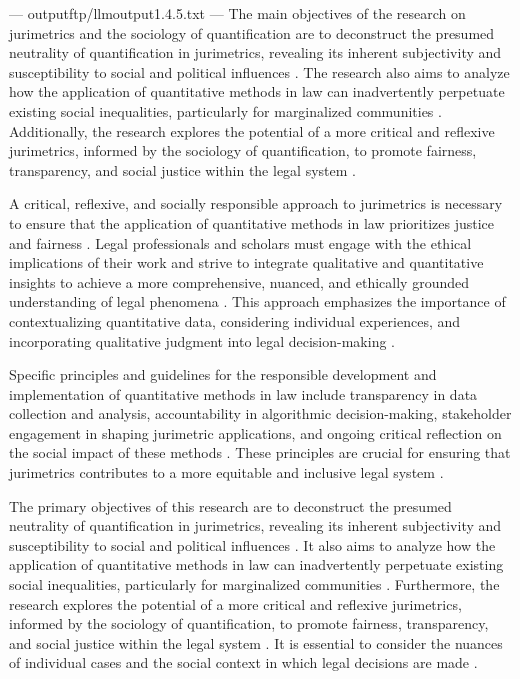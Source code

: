 ---
outputftp/llmoutput1.4.5.txt
---
The main objectives of the research on jurimetrics and the sociology of quantification are to deconstruct the presumed neutrality of quantification in jurimetrics, revealing its inherent subjectivity and susceptibility to social and political influences \cite{10.1590/dados.2022.65.3.267,10.1080/07329113.2015.1046739}. The research also aims to analyze how the application of quantitative methods in law can inadvertently perpetuate existing social inequalities, particularly for marginalized communities \cite{10.1590/dados.2022.65.3.267,10.1080/07329113.2015.1046739}. Additionally, the research explores the potential of a more critical and reflexive jurimetrics, informed by the sociology of quantification, to promote fairness, transparency, and social justice within the legal system \cite{10.1590/dados.2022.65.3.267,10.1080/07329113.2015.1046739}.

A critical, reflexive, and socially responsible approach to jurimetrics is necessary to ensure that the application of quantitative methods in law prioritizes justice and fairness \cite{10.1007/s11186-021-09453-1,unger2021process}. Legal professionals and scholars must engage with the ethical implications of their work and strive to integrate qualitative and quantitative insights to achieve a more comprehensive, nuanced, and ethically grounded understanding of legal phenomena \cite{10.1007/s11186-021-09453-1,unger2021process}. This approach emphasizes the importance of contextualizing quantitative data, considering individual experiences, and incorporating qualitative judgment into legal decision-making \cite{10.1007/s11186-021-09453-1,unger2021process}.

Specific principles and guidelines for the responsible development and implementation of quantitative methods in law include transparency in data collection and analysis, accountability in algorithmic decision-making, stakeholder engagement in shaping jurimetric applications, and ongoing critical reflection on the social impact of these methods \cite{10.1007/s11186-021-09453-1,unger2021process}. These principles are crucial for ensuring that jurimetrics contributes to a more equitable and inclusive legal system \cite{10.1007/s11186-021-09453-1,unger2021process}.

The primary objectives of this research are to deconstruct the presumed neutrality of quantification in jurimetrics, revealing its inherent subjectivity and susceptibility to social and political influences \cite{10.1590/dados.2022.65.3.267,10.5040/9781350220645}. It also aims to analyze how the application of quantitative methods in law can inadvertently perpetuate existing social inequalities, particularly for marginalized communities \cite{10.1057/s41599-020-00557-0,10.1590/dados.2022.65.3.267}. Furthermore, the research explores the potential of a more critical and reflexive jurimetrics, informed by the sociology of quantification, to promote fairness, transparency, and social justice within the legal system \cite{10.1590/dados.2022.65.3.267,10.5040/9781350220645}. It is essential to consider the nuances of individual cases and the social context in which legal decisions are made \cite{10.1590/dados.2022.65.3.267,10.1080/07329113.2015.1046739}.

